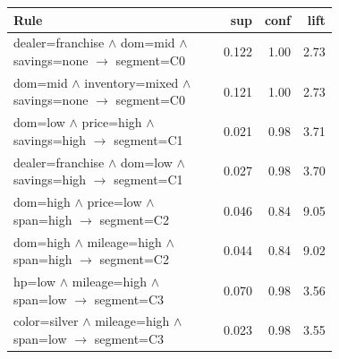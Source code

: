 \begin{tabular}{@{}>{\raggedright\arraybackslash}p{0.72\linewidth}rrr@{}}
\toprule
Rule & sup & conf & lift \\
\midrule
dealer=franchise $\wedge$ dom=mid $\wedge$ savings=none $\rightarrow$ segment=C0 & 0.122 & 1.00 & 2.73 \\
dom=mid $\wedge$ inventory=mixed $\wedge$ savings=none $\rightarrow$ segment=C0 & 0.121 & 1.00 & 2.73 \\
\midrule
dom=low $\wedge$ price=high $\wedge$ savings=high $\rightarrow$ segment=C1 & 0.021 & 0.98 & 3.71 \\
dealer=franchise $\wedge$ dom=low $\wedge$ savings=high $\rightarrow$ segment=C1 & 0.027 & 0.98 & 3.70 \\
\midrule
dom=high $\wedge$ price=low $\wedge$ span=high $\rightarrow$ segment=C2 & 0.046 & 0.84 & 9.05 \\
dom=high $\wedge$ mileage=high $\wedge$ span=high $\rightarrow$ segment=C2 & 0.044 & 0.84 & 9.02 \\
\midrule
hp=low $\wedge$ mileage=high $\wedge$ span=low $\rightarrow$ segment=C3 & 0.070 & 0.98 & 3.56 \\
color=silver $\wedge$ mileage=high $\wedge$ span=low $\rightarrow$ segment=C3 & 0.023 & 0.98 & 3.55 \\
\bottomrule
\end{tabular}

